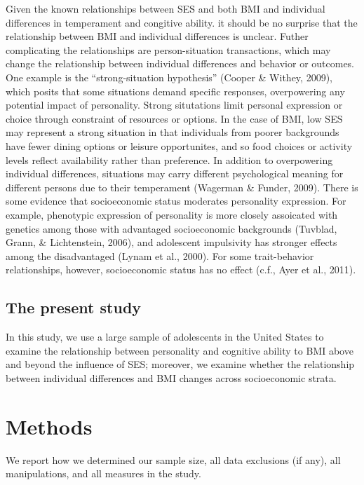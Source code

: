 \documentclass[man]{apa6}
\begin{document}
Given the known relationships between SES and both BMI and individual differences in temperament and congitive ability. it should be no surprise that the relationship between BMI and individual differences is unclear. Futher complicating the relationships are person-situation transactions, which may change the relationship between individual differences and behavior or outcomes. One example is the \enquote{strong-situation hypothesis} (Cooper \& Withey, 2009), which posits that some situations demand specific responses, overpowering any potential impact of personality. Strong situtations limit personal expression or choice through constraint of resources or options. In the case of BMI, low SES may represent a strong situation in that individuals from poorer backgrounds have fewer dining options or leisure opportunites, and so food choices or activity levels reflect availability rather than preference. In addition to overpowering individual differences, situations may carry different psychological meaning for different persons due to their temperament (Wagerman \& Funder, 2009). There is some evidence that socioeconomic status moderates personality expression. For example, phenotypic expression of personality is more closely assoicated with genetics among those with advantaged socioeconomic backgrounds (Tuvblad, Grann, \& Lichtenstein, 2006), and adolescent impulsivity has stronger effects among the disadvantaged (Lynam et al., 2000). For some trait-behavior relationships, however, socioeconomic status has no effect (c.f., Ayer et al., 2011).

\hypertarget{the-present-study}{%
\subsection{The present study}\label{the-present-study}}

In this study, we use a large sample of adolescents in the United States to examine the relationship between personality and cognitive ability to BMI above and beyond the influence of SES; moreover, we examine whether the relationship between individual differences and BMI changes across socioeconomic strata.

\hypertarget{methods}{%
\section{Methods}\label{methods}}

We report how we determined our sample size, all data exclusions (if any), all manipulations, and all measures in the study.
\end{document}
